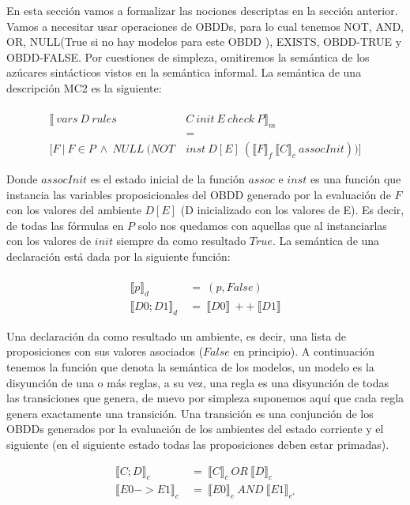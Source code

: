 En esta sección vamos a formalizar las nociones descriptas en la sección anterior. Vamos a necesitar usar operaciones de OBDDs, para lo cual tenemos NOT, AND, OR, NULL(True si no hay modelos para este OBDD \cite{Waldmann:6} ), EXISTS, OBDD-TRUE y OBDD-FALSE. Por cuestiones de simpleza, omitiremos la semántica de los azúcares sintácticos vistos en la semántica informal. La semántica de una descripción MC2 es la siguiente:\\
\\
\begin{align*}
\llbracket \ vars\ D\ rules\ & C\  init\ E\ check\ P  \rrbracket _{m} \\ 
&= \\
[F\ |\ F \in P\ \land\ NULL\ (NOT\ & inst\ D[E]\ (\llbracket F \rrbracket _{f}\ \llbracket C \rrbracket _{c}\ assocInit))] 
\end{align*}

\noindent Donde $assocInit$ es el estado inicial de la función $assoc$ e $inst$ es una función que instancia las variables proposicionales del OBDD generado por la evaluación de $F$ con los valores del ambiente $D[E]$ (D inicializado con los valores de E). Es decir, de todas las fórmulas en $P$ solo nos quedamos con aquellas que al instanciarlas con los valores de $init$ siempre da como resultado $True$. La semántica de una declaración está dada por la siguiente función: \\
\\
\begin{align*}
\llbracket p \rrbracket _{d}\ &=\ (p,False) \\
\llbracket D0;D1 \rrbracket _{d}\ &=\ \llbracket D0 \rrbracket \ ++\ \llbracket D1 \rrbracket  
\end{align*}

\noindent Una declaración da como resultado un ambiente, es decir, una lista de proposiciones con sus valores asociados ($False$ en principio). A continuación tenemos la función que denota la semántica de los modelos, un modelo es la disyunción de una o más reglas, a su vez, una regla es una disyunción de todas las transiciones que genera, de nuevo por simpleza suponemos aquí que cada regla genera exactamente una transición. Una transición es una conjunción de los OBDDs generados por la evaluación de los ambientes del estado corriente y el siguiente (en el siguiente estado todas las proposiciones deben estar primadas).

\begin{align*}
\llbracket C;D \rrbracket _{c}\ &=\ \llbracket C \rrbracket _{c}\ OR\ \llbracket D \rrbracket _{c} \\
\llbracket E0->E1 \rrbracket _{c}\ &=\ \llbracket E0 \rrbracket _{e}\ AND\ \llbracket E1 \rrbracket _{e'}
\end{align*}

